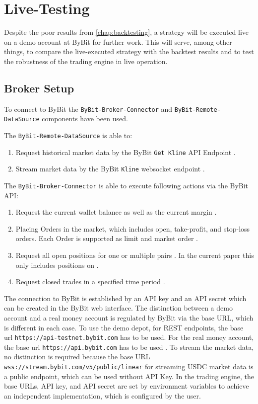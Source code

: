 \section{Live-Testing}

Despite the poor results from \autoref{chap:backtesting}, a strategy will be executed live on a demo account at ByBit for further work.
This will serve, among other things, to compare the live-executed strategy with the backtest results and to test the robustness of the trading engine in live operation.

\subsection{Broker Setup}

To connect to ByBit the \verb|ByBit-Broker-Connector| and \verb|ByBit-Remote-DataSource| components have been used.

The \verb|ByBit-Remote-DataSource| is able to:

\begin{enumerate}
    \item Request historical market data by the ByBit \texttt{Get Kline} API Endpoint \cite{get-kline}.
    \item Stream market data by the ByBit \texttt{Kline} websocket endpoint \cite{stream-kline}.
\end{enumerate}

\noindent
The \verb|ByBit-Broker-Connector| is able to execute following actions via the ByBit API:

\begin{enumerate}
    \item Request the current wallet balance as well as the current margin \cite{wallet-balance}.
    \item Placing Orders in the market, which includes open, take-profit, and stop-loss orders. Each Order is supported as limit and market order \cite{place-order}.
    \item Request all open positions for one or multiple pairs \cite{position-info}. In the current paper this only includes positions on \ethusdc.
    \item Request closed trades in a specified time period \cite{closed-pnl}.
\end{enumerate}

\noindent
The connection to ByBit is established by an API key and an API secret which can be created in the ByBit web interface.
The distinction between a demo account and a real money account is regulated by ByBit via the base URL, which is different in each case.
To use the demo depot, for REST endpoints, the base url \texttt{https://api-testnet.bybit.com} has to be used.
For the real money account, the base url \texttt{https://api.bybit.com} has to be used \cite{integration}.
To stream the market data, no distinction is required because the base URL \texttt{wss://stream.bybit.com/v5/public/linear} \cite{ws-connect} for streaming USDC market data is a public endpoint, which can be used without API Key.
In the trading engine, the base URLs, API key, and API secret are set by environment variables to achieve an independent implementation, which is configured by the user.

